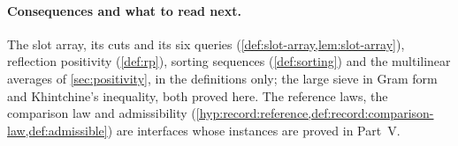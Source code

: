 \paragraph{Consequences and what to read next.}
The slot array, its cuts and its six queries
(\cref{def:slot-array,lem:slot-array}), reflection positivity (\cref{def:rp}),
sorting sequences (\cref{def:sorting}) and the multilinear averages of
\cref{sec:positivity}, in the definitions only; the large sieve in Gram form and
Khintchine's inequality, both proved here. The reference laws, the comparison
law and admissibility
(\cref{hyp:record:reference,def:record:comparison-law,def:admissible}) are
interfaces whose instances are proved in Part~V.

